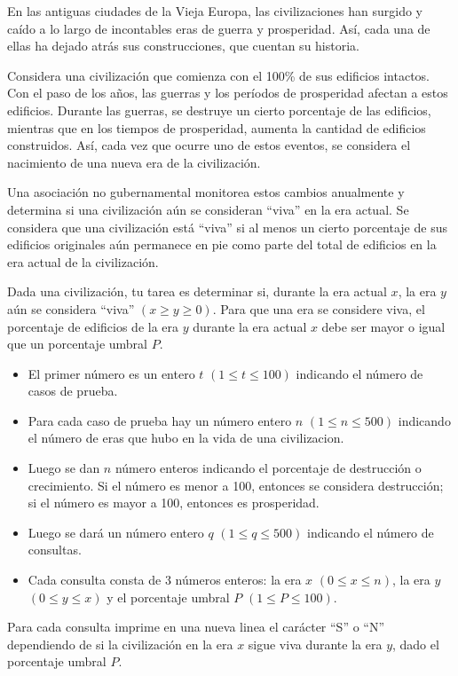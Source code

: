 
En las antiguas ciudades de la Vieja Europa, las civilizaciones han surgido y caído a lo largo de incontables eras de guerra y prosperidad. Así, cada una de ellas ha dejado atrás sus construcciones, que cuentan su historia.

Considera una civilización que comienza con el 100\% de sus edificios intactos. Con el paso de los años, las guerras y los períodos de prosperidad afectan a estos edificios. Durante las guerras, se destruye un cierto porcentaje de las edificios, mientras que en los tiempos de prosperidad, aumenta la cantidad de edificios construidos. Así, cada vez que ocurre uno de estos eventos, se considera el nacimiento de una nueva era de la civilización.

Una asociación no gubernamental monitorea estos cambios anualmente y determina si una civilización aún se consideran ``viva'' en la era actual. Se considera que una civilización está ``viva'' si al menos un cierto porcentaje de sus edificios originales aún permanece en pie como parte del total de edificios en la era actual de la civilización.

Dada una civilización, tu tarea es determinar si, durante la era actual $x$, la era $y$ aún se considera ``viva'' $(x \geq y \geq 0)$. Para que una era se considere viva, el porcentaje de edificios de la era $y$ durante la era actual $x$ debe ser mayor o igual que un porcentaje umbral $P$.


\begin{itemize}
    \item El primer número es un entero $t$ $(1 \leq t \leq 100)$ indicando el número de casos de prueba.
    \item Para cada caso de prueba hay un número entero $n$ $(1 \leq n \leq 500)$ indicando el número de eras que hubo en la vida de una civilizacion.
    \item Luego se dan $n$ número enteros indicando el porcentaje de destrucción o crecimiento. Si el número es menor a 100, entonces se considera destrucción; si el número es mayor a 100, entonces es prosperidad.
    \item Luego se dará un número entero $q$ $(1 \leq q \leq 500)$ indicando el número de consultas.
    \item Cada consulta consta de 3 números enteros: la era $x$ $(0 \leq x \leq n)$, la era $y$ $(0 \leq y \leq x)$ y el porcentaje umbral $P$  $(1 \leq P \leq 100)$.
\end{itemize}

\outputText

Para cada consulta imprime en una nueva linea el carácter ``S'' o ``N'' dependiendo de si la civilización en la era $x$ sigue viva durante la era $y$, dado el porcentaje umbral $P$.

\exampleCases

\begin{example}
\end{example}
